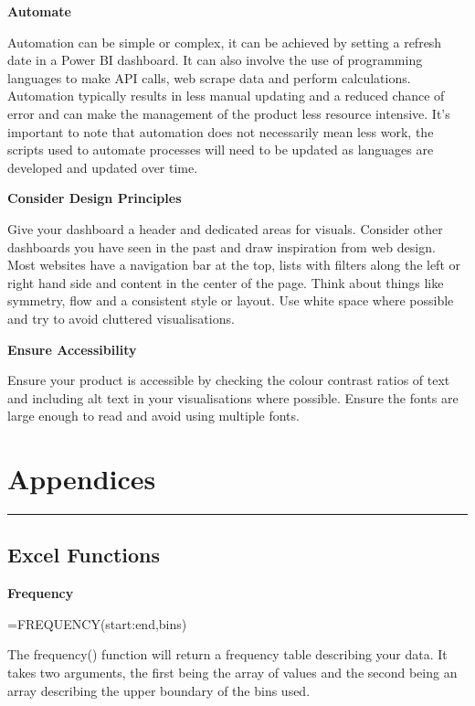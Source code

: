 \documentclass[
]{book}
\begin{document}
\textbf{Automate }

Automation can be simple or complex, it can be achieved by setting a refresh date in a Power BI dashboard. It can also involve the use of programming languages to make API calls, web scrape data and perform calculations. Automation typically results in less manual updating and a reduced chance of error and can make the management of the product less resource intensive. It's important to note that automation does not necessarily mean less work, the scripts used to automate processes will need to be updated as languages are developed and updated over time.

\textbf{Consider Design Principles}

Give your dashboard a header and dedicated areas for visuals. Consider other dashboards you have seen in the past and draw inspiration from web design. Most websites have a navigation bar at the top, lists with filters along the left or right hand side and content in the center of the page. Think about things like symmetry, flow and a consistent style or layout. Use white space where possible and try to avoid cluttered visualisations.

\textbf{Ensure Accessibility}

Ensure your product is accessible by checking the colour contrast ratios of text and including alt text in your visualisations where possible. Ensure the fonts are large enough to read and avoid using multiple fonts.

\hypertarget{appendices}{%
\chapter*{Appendices}\label{appendices}}

\begin{center}\rule{0.5\linewidth}{0.5pt}\end{center}

\hypertarget{excel-functions}{%
\section*{Excel Functions}\label{excel-functions}}

\textbf{Frequency}

=FREQUENCY(start:end,bins)

The frequency() function will return a frequency table describing your data. It takes two arguments, the first being the array of values and the second being an array describing the upper boundary of the bins used.
\end{document}
